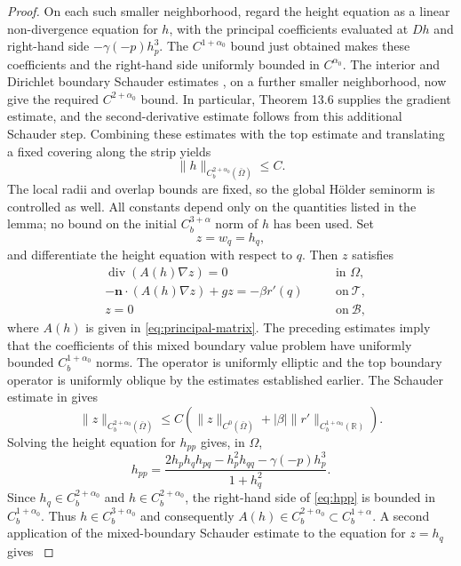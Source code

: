 \documentclass[12pt,letterpaper]{amsart}
\numberwithin{equation}{section}
\begin{document}
\begin{proof}
On each such smaller neighborhood, regard the height equation as a linear non-divergence equation for $h$, with the principal coefficients evaluated at $Dh$ and right-hand side $-\gamma(-p)h_p^3$. The $C^{1+\alpha_0}$ bound just obtained makes these coefficients and the right-hand side uniformly bounded in $C^{\alpha_0}$. The interior and Dirichlet boundary Schauder estimates \cite[Chapter 6]{Ts}, on a further smaller neighborhood, now give the required $C^{2+\alpha_0}$ bound. In particular, Theorem 13.6 supplies the gradient estimate, and the second-derivative estimate follows from this additional Schauder step. Combining these estimates with the top estimate and translating a fixed covering along the strip yields
\[
\|h\|_{C_b^{2+\alpha_0}(\bar{\Omega})} \leq C.
\]
The local radii and overlap bounds are fixed, so the global H\"older seminorm is controlled as well. All constants depend only on the quantities listed in the lemma; no bound on the initial $C_b^{3+\alpha}$ norm of $h$ has been used.
Set
\[z=w_q=h_q,\]
{and differentiate the height equation with respect to $q$. Then $z$ satisfies}
\begin{align*}
&\operatorname{div}(A(h)\nabla z) = 0 \quad &&\text{in } \Omega,\\
&-\mathbf n\cdot(A(h)\nabla z)+gz=-\beta r'(q)\quad&&\mathrm{on~}\mathcal T,\\
&z=0&&\mathrm{on~}\mathcal B,
\end{align*}
where $A(h)$ is given in \eqref{eq:principal-matrix}.
The preceding estimates imply that the coefficients of this mixed boundary value problem have uniformly bounded \( C_b^{1+\alpha_0} \) norms. The operator is uniformly elliptic and the top boundary operator is uniformly oblique by the estimates established earlier. The Schauder estimate in \cite{agmon} gives
\begin{equation*}
	\|z\|_{C_b^{2+\alpha_0}(\bar{\Omega})} \leq C \left( \|z\|_{C^0(\bar{\Omega})} + |\beta| \|r'\|_{C_b^{1+\alpha_0}(\mathbb{R})} \right).
\end{equation*}
{Solving the height equation for $h_{pp}$ gives, in $\Omega$,}
\begin{equation}\label{eq:hpp}
h_{pp} = \frac{2h_p h_q h_{pq} - h_p^2 h_{qq} - \gamma(-p)h_p^3}{1 + h_q^2}.
\end{equation}
{Since $h_q\in C_b^{2+\alpha_0}$ and $h\in C_b^{2+\alpha_0}$, the right-hand side of \eqref{eq:hpp} is bounded in $C_b^{1+\alpha_0}$. Thus $h\in C_b^{3+\alpha_0}$ and consequently $A(h)\in C_b^{2+\alpha_0}\subset C_b^{1+\alpha}$. A second application of the mixed-boundary Schauder estimate to the equation for $z=h_q$ gives
}
\end{proof}
\end{document}
